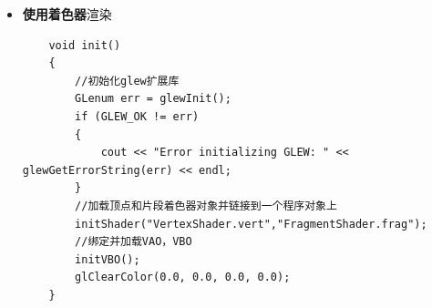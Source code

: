 \documentclass[UTF8,a4paper,8pt]{ctexart}
\begin{document}
\begin{itemize}[itemindent = 1em]
\begin{lstlisting}
		//创建着色器对象：片断着色器    
		fShader = glCreateShader(GL_FRAGMENT_SHADER);  
		//错误检测    
		if (0 == fShader)  
		{  
			cerr << "ERROR : Create fragment shader failed" << endl;  
			exit(1);  
		}  
		
		//把着色器源代码和着色器对象相关联    
		const GLchar *fShaderCode = textFileRead(FShaderFile);  
		const GLchar *fCodeArray[1] = { fShaderCode };  
		glShaderSource(fShader, 1, fCodeArray, NULL);  
		
		//编译着色器对象    
		glCompileShader(fShader);  
		
		//检查编译是否成功    
		glGetShaderiv(fShader, GL_COMPILE_STATUS, &compileResult);  
		if (GL_FALSE == compileResult)  
		{  
			GLint logLen;  
			//得到编译日志长度    
			glGetShaderiv(fShader, GL_INFO_LOG_LENGTH, &logLen);  
			if (logLen > 0)  
			{  
				char *log = (char *)malloc(logLen);  
				GLsizei written;  
				//得到日志信息并输出    
				glGetShaderInfoLog(fShader, logLen, &written, log);  
				cerr << "fragment shader compile log : " << endl;  
				cerr << log << endl;  
				free(log);//释放空间    
			}  
		}  
		
		//3、链接着色器对象    
		//创建着色器程序    
		GLuint programHandle = glCreateProgram();  
		if (!programHandle)  
		{  
			cerr << "ERROR : create program failed" << endl;  
			exit(1);  
		}  
		//将着色器程序链接到所创建的程序中    
		glAttachShader(programHandle, vShader);  
		glAttachShader(programHandle, fShader);  
		//将这些对象链接成一个可执行程序    
		glLinkProgram(programHandle);  
		//查询链接的结果    
		GLint linkStatus;  
		glGetProgramiv(programHandle, GL_LINK_STATUS, &linkStatus);  
		if (GL_FALSE == linkStatus)  
		{  
			cerr << "ERROR : link shader program failed" << endl;  
			GLint logLen;  
			glGetProgramiv(programHandle, GL_INFO_LOG_LENGTH,  
			&logLen);  
			if (logLen > 0)  
			{  
				char *log = (char *)malloc(logLen);  
				GLsizei written;  
				glGetProgramInfoLog(programHandle, logLen,  
				&written, log);  
				cerr << "Program log : " << endl;  
				cerr << log << endl;  
			}  
		}  
		else//链接成功，在OpenGL管线中使用渲染程序    
		{  
			glUseProgram(programHandle);  
		}  
	}  
							\end{lstlisting}
						\item \textbf{使用着色器}渲染
							\begin{lstlisting}
	void init()  
	{  
		//初始化glew扩展库    
		GLenum err = glewInit();  
		if (GLEW_OK != err)  
		{  
			cout << "Error initializing GLEW: " << glewGetErrorString(err) << endl;  
		}  
		//加载顶点和片段着色器对象并链接到一个程序对象上  
		initShader("VertexShader.vert","FragmentShader.frag");  
		//绑定并加载VAO，VBO  
		initVBO();  
		glClearColor(0.0, 0.0, 0.0, 0.0);  
	}  
	

\end{lstlisting}
\end{itemize}
\end{document}
